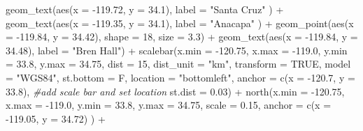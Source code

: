 \documentclass[
]{article}
\newenvironment{Shaded}{\begin{snugshade}}{\end{snugshade}}
\newcommand{\AttributeTok}[1]{\textcolor[rgb]{0.77,0.63,0.00}{#1}}
\newcommand{\CommentTok}[1]{\textcolor[rgb]{0.56,0.35,0.01}{\textit{#1}}}
\newcommand{\ConstantTok}[1]{\textcolor[rgb]{0.00,0.00,0.00}{#1}}
\newcommand{\DecValTok}[1]{\textcolor[rgb]{0.00,0.00,0.81}{#1}}
\newcommand{\FloatTok}[1]{\textcolor[rgb]{0.00,0.00,0.81}{#1}}
\newcommand{\FunctionTok}[1]{\textcolor[rgb]{0.00,0.00,0.00}{#1}}
\newcommand{\NormalTok}[1]{#1}
\newcommand{\SpecialCharTok}[1]{\textcolor[rgb]{0.00,0.00,0.00}{#1}}
\newcommand{\StringTok}[1]{\textcolor[rgb]{0.31,0.60,0.02}{#1}}
\begin{document}
\begin{Shaded}
\begin{Highlighting}[]
  \FunctionTok{geom\_text}\NormalTok{(}\FunctionTok{aes}\NormalTok{(}\AttributeTok{x =} \SpecialCharTok{{-}}\FloatTok{119.72}\NormalTok{, }\AttributeTok{y =} \FloatTok{34.1}\NormalTok{),  }\AttributeTok{label =} \StringTok{"Santa Cruz"}\NormalTok{ ) }\SpecialCharTok{+}
  \FunctionTok{geom\_text}\NormalTok{(}\FunctionTok{aes}\NormalTok{(}\AttributeTok{x =} \SpecialCharTok{{-}}\FloatTok{119.35}\NormalTok{, }\AttributeTok{y =} \FloatTok{34.1}\NormalTok{),  }\AttributeTok{label =} \StringTok{"Anacapa"}\NormalTok{ ) }\SpecialCharTok{+}
  \FunctionTok{geom\_point}\NormalTok{(}\FunctionTok{aes}\NormalTok{(}\AttributeTok{x =} \SpecialCharTok{{-}}\FloatTok{119.84}\NormalTok{, }\AttributeTok{y =} \FloatTok{34.42}\NormalTok{), }\AttributeTok{shape =} \DecValTok{18}\NormalTok{, }\AttributeTok{size =} \FloatTok{3.3}\NormalTok{) }\SpecialCharTok{+}
  \FunctionTok{geom\_text}\NormalTok{(}\FunctionTok{aes}\NormalTok{(}\AttributeTok{x =} \SpecialCharTok{{-}}\FloatTok{119.84}\NormalTok{, }\AttributeTok{y =} \FloatTok{34.48}\NormalTok{), }\AttributeTok{label =} \StringTok{"Bren Hall"}\NormalTok{) }\SpecialCharTok{+}
  \FunctionTok{scalebar}\NormalTok{(}\AttributeTok{x.min =} \SpecialCharTok{{-}}\FloatTok{120.75}\NormalTok{, }\AttributeTok{x.max =} \SpecialCharTok{{-}}\FloatTok{119.0}\NormalTok{, }\AttributeTok{y.min =} \FloatTok{33.8}\NormalTok{, }\AttributeTok{y.max =} \FloatTok{34.75}\NormalTok{,}
           \AttributeTok{dist =} \DecValTok{15}\NormalTok{, }\AttributeTok{dist\_unit =} \StringTok{"km"}\NormalTok{, }
           \AttributeTok{transform =} \ConstantTok{TRUE}\NormalTok{, }\AttributeTok{model =} \StringTok{"WGS84"}\NormalTok{, }\AttributeTok{st.bottom =}\NormalTok{ F,}
           \AttributeTok{location =} \StringTok{"bottomleft"}\NormalTok{, }
           \AttributeTok{anchor =} \FunctionTok{c}\NormalTok{(}\AttributeTok{x =} \SpecialCharTok{{-}}\FloatTok{120.7}\NormalTok{, }\AttributeTok{y =} \FloatTok{33.8}\NormalTok{), }\CommentTok{\#add scale bar and set location}
           \AttributeTok{st.dist =} \FloatTok{0.03}\NormalTok{) }\SpecialCharTok{+}
  \FunctionTok{north}\NormalTok{(}\AttributeTok{x.min =} \SpecialCharTok{{-}}\FloatTok{120.75}\NormalTok{, }\AttributeTok{x.max =} \SpecialCharTok{{-}}\FloatTok{119.0}\NormalTok{, }\AttributeTok{y.min =} \FloatTok{33.8}\NormalTok{, }\AttributeTok{y.max =} \FloatTok{34.75}\NormalTok{,}
        \AttributeTok{scale =} \FloatTok{0.15}\NormalTok{, }\AttributeTok{anchor =} \FunctionTok{c}\NormalTok{(}\AttributeTok{x =} \SpecialCharTok{{-}}\FloatTok{119.05}\NormalTok{, }\AttributeTok{y =} \FloatTok{34.72}\NormalTok{) ) }\SpecialCharTok{+}

\end{Highlighting}
\end{Shaded}
\end{document}
